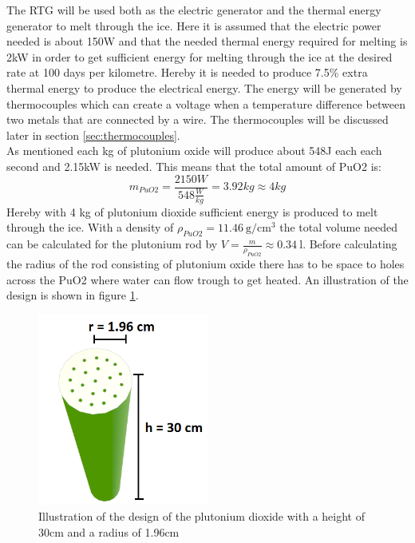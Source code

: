 \label{sec:ThermalDesign}
The RTG will be used both as the electric generator and the thermal energy generator to melt through the ice. Here it is assumed that the electric power needed is about 150W and that the needed thermal energy required for melting is 2kW in order to get sufficient energy for melting through the ice at the desired rate at 100 days per kilometre. Hereby it is needed to produce 7.5\% extra thermal energy to produce the electrical energy. The energy will be generated by thermocouples which can create a voltage when a temperature difference between two metals that are connected by a wire. The thermocouples will be discussed later in section \ref{sec:thermocouples}. \\

\noindent
As mentioned each kg of plutonium oxide will produce about 548J each each second and 2.15kW is needed. This means that the total amount of PuO2 is: 
\begin{equation}
m_{PuO2} = \frac{2150W}{548 \frac{W}{kg}} = 3.92 kg \approx 4 kg 
\end{equation}
Hereby with 4 kg of plutonium dioxide sufficient energy is produced to melt through the ice. With a density of $\rho_{PuO2} = \SI{11.46}{\gram\per\cubic\cm}$\cite{golovnin2001a} the total volume needed can be calculated for the plutonium rod by $V = \frac{m}{\rho_{PuO2}} \approx \SI{0.34}{\litre}$. Before calculating the radius of the rod consisting of plutonium oxide there has to be space to holes across the PuO2 where water can flow trough to get heated. An illustration of the design is shown in figure \ref{fig:RTGcenter}.
\begin{figure}[htb]
  \centering
  \includegraphics[width=0.5\textwidth]{figures/Ricardo/RTG3.png}
  \caption{Illustration of the design of the plutonium dioxide with a height of 30cm and a radius of 1.96cm}
  \label{fig:RTGcenter}
\end{figure}

